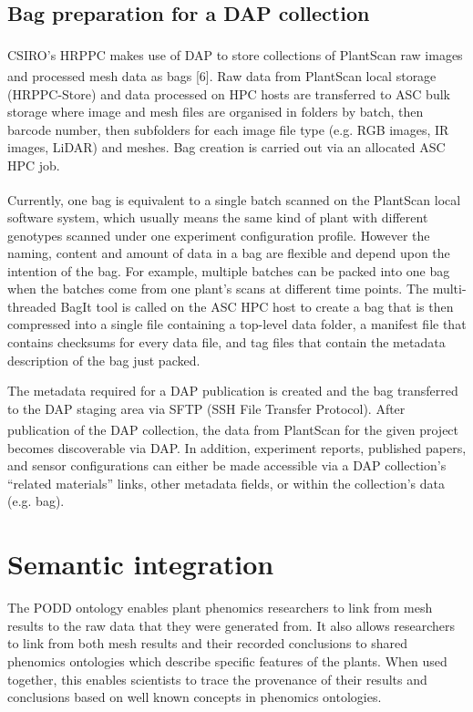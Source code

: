 \documentclass{llncs}
\begin{document}
\subsection{Bag preparation for a DAP collection}
CSIRO’s HRPPC makes use of DAP to store collections of PlantScan\textsuperscript{\texttrademark} raw images
and processed mesh data as bags [6]. Raw data from PlantScan\textsuperscript{\texttrademark} local storage
(HRPPC-Store) and data processed on HPC hosts are transferred to ASC bulk
storage where image and mesh files are organised in folders by batch, then
barcode number, then subfolders for each image file type (e.g. RGB images, IR
images, LiDAR) and meshes. Bag creation is carried out via an allocated ASC HPC
job.


Currently, one bag is equivalent to a single batch scanned on the PlantScan\textsuperscript{\texttrademark}
local software system, which usually means the same kind of plant with different
genotypes scanned under one  experiment configuration profile.  However the
naming, content and amount of data in a bag are flexible and depend upon the
intention of the bag. For example, multiple batches can be packed into one bag
when the batches come from one plant’s scans at different time points. The
multi-threaded BagIt tool is called on the ASC HPC host to create a bag that is
then compressed into a single file containing a top-level data folder, a
manifest file that contains checksums for every data file, and tag files that
contain the metadata description of the bag just packed. 


The metadata required for a DAP publication is created and the bag transferred
to the DAP staging area via SFTP (SSH File Transfer Protocol). After publication
of the DAP collection, the data from PlantScan\textsuperscript{\texttrademark} for the given project becomes
discoverable via DAP. In addition, experiment reports, published papers, and
sensor configurations can either be made accessible via a DAP collection's
``related materials'' links, other metadata fields, or within the collection's
data (e.g. bag).


\section{Semantic integration}
The PODD ontology enables plant phenomics researchers to link from mesh results
to the raw data that they were generated from. It also allows researchers to
link from both mesh results and their recorded conclusions to shared phenomics
ontologies which describe specific features of the plants. When used together,
this enables scientists to trace the provenance of their results and conclusions
based on well known concepts in phenomics ontologies.
\end{document}
